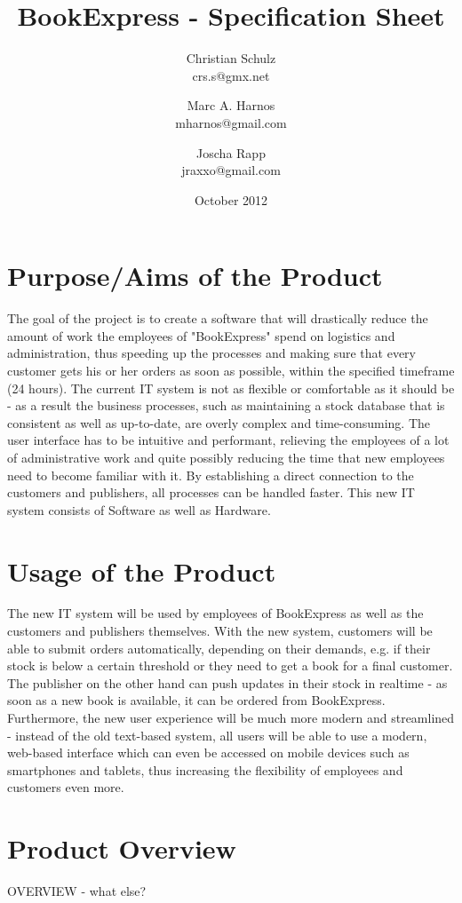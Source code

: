 \documentclass[a4paper]{article}
\author{Christian Schulz\\crs.s@gmx.net \and Marc A. Harnos\\mharnos@gmail.com \and Joscha Rapp\\jraxxo@gmail.com}
\begin{document}
\title{BookExpress - Specification Sheet}
\date{October 2012}
\maketitle
\clearpage
\tableofcontents
\clearpage

\section{Purpose/Aims of the Product}
The goal of the project is to create a software that will drastically reduce the amount of work the employees of "BookExpress" spend on logistics and administration, thus speeding up the processes and making sure that every customer gets his or her orders as soon as possible, within the specified timeframe (24 hours). The current IT system is not as flexible or comfortable as it should be - as a result the business processes, such as maintaining a stock database that is consistent as well as up-to-date, are overly complex and time-consuming. The user interface has to be intuitive and performant, relieving the employees of a lot of administrative work and quite possibly reducing the time that new employees need to become familiar with it. By establishing a direct connection to the customers and publishers, all processes can be handled faster. This new IT system consists of Software as well as Hardware. 
\\
\section{Usage of the Product}
The new IT system will be used by employees of BookExpress as well as the customers and publishers themselves. With the new system, customers will be able to submit orders automatically, depending on their demands, e.g. if their stock is below a certain threshold or they need to get a book for a final customer. The publisher on the other hand can push updates in their stock in realtime - as soon as a new book is available, it can be ordered from BookExpress. Furthermore, the new user experience will be much more modern and streamlined - instead of the old text-based system, all users will be able to use a modern, web-based interface which can even be accessed on mobile devices such as smartphones and tablets, thus increasing the flexibility of employees and customers even more.
\\	
\section{Product Overview}
OVERVIEW - what else?
\\
\end{document}
